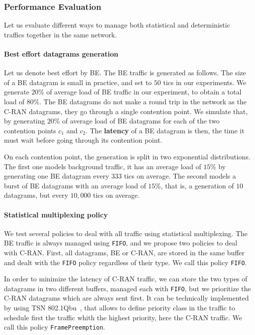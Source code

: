 \documentclass[a4paper,10pt]{article}
\newcommand\FIFO{\texttt{FIFO}\xspace}
\newcommand\framepre{\texttt{FramePreemption}\xspace}
\begin{document}
    \subsubsection{Performance Evaluation}
    
    Let us evaluate different ways to manage both statistical and deterministic traffics together in the same network.
 
    \paragraph{Best effort datagrams generation}
    
    Let us denote best effort by BE. The BE traffic is generated as follows. The size of a BE datagram is small in practice, and set to $50$ tics in our experiments. We generate $20\%$ of average load of BE traffic in our experiment, to obtain a total load of $80\%$. The BE datagrams do not make a round trip
    in the network as the C-RAN datagrams, they go through a single contention point. 
    We simulate that, by generating $20\%$ of average load of BE datagrams for each of the two contention points $c_1$ and $c_2$. The \textbf{latency} of a BE datagram is then, the time it must wait before going
    through its contention point.

    On each contention point, the generation is split in two exponential distributions. The first one models 
    background traffic, it has an average load of $15\%$ by generating one BE datagram every $333$ tics on average. The second models a burst of BE datagrams with an average load of $15\%$, that is, a generation of $10$ datagrams, but every $10,000$ tics on average. 
   
   	\paragraph{Statistical multiplexing policy}

   	We test several policies to deal with all traffic using statistical multiplexing.
   	The BE traffic is always managed using \FIFO, and we propose two policies to deal with C-RAN. First, all datagrams, BE or C-RAN, are stored in the same buffer and dealt with the \FIFO policy regardless of their type. We call this policy \FIFO.

    In order to minimize the latency of C-RAN traffic, we can store the two types of datagrams in two different buffers, managed each with \FIFO, but we prioritize the C-RAN datagrams which are always sent first. It can be technically implemented by using TSN 802.1Qbu~\cite{ieee802}, that allows to define priority class in the traffic to schedule first the traffic whith the highest priority, here the C-RAN traffic. We call this policy \framepre.
    
\end{document}

